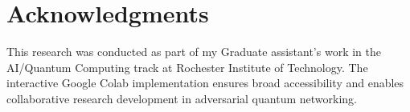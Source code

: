 \documentclass[11pt,a4paper]{article}
\begin{document}
\section{Acknowledgments}

This research was conducted as part of my Graduate assistant's work in the AI/Quantum Computing track at Rochester Institute of Technology. The interactive Google Colab implementation ensures broad accessibility and enables collaborative research development in adversarial quantum networking.
\end{document}
